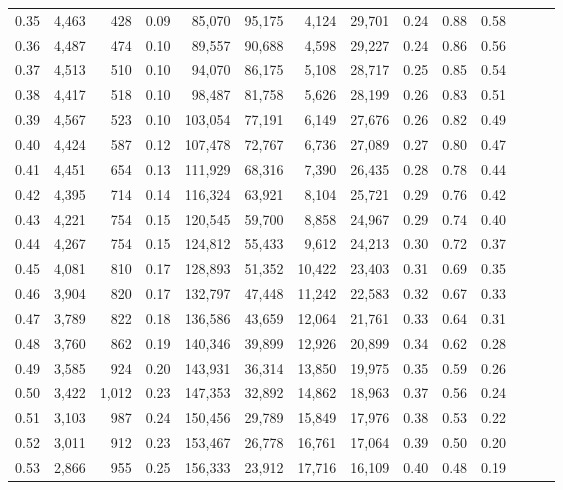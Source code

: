 \begin{tabular}{rrrrrrrrrrrrrr}
0.35 &  4,463 &    428 &  0.09 &   85,070 &   95,175 &   4,124 &  29,701 &  0.24 &  0.88 &      0.58 \\
0.36 &  4,487 &    474 &  0.10 &   89,557 &   90,688 &   4,598 &  29,227 &  0.24 &  0.86 &      0.56 \\
0.37 &  4,513 &    510 &  0.10 &   94,070 &   86,175 &   5,108 &  28,717 &  0.25 &  0.85 &      0.54 \\
0.38 &  4,417 &    518 &  0.10 &   98,487 &   81,758 &   5,626 &  28,199 &  0.26 &  0.83 &      0.51 \\
0.39 &  4,567 &    523 &  0.10 &  103,054 &   77,191 &   6,149 &  27,676 &  0.26 &  0.82 &      0.49 \\
0.40 &  4,424 &    587 &  0.12 &  107,478 &   72,767 &   6,736 &  27,089 &  0.27 &  0.80 &      0.47 \\
0.41 &  4,451 &    654 &  0.13 &  111,929 &   68,316 &   7,390 &  26,435 &  0.28 &  0.78 &      0.44 \\
0.42 &  4,395 &    714 &  0.14 &  116,324 &   63,921 &   8,104 &  25,721 &  0.29 &  0.76 &      0.42 \\
0.43 &  4,221 &    754 &  0.15 &  120,545 &   59,700 &   8,858 &  24,967 &  0.29 &  0.74 &      0.40 \\
0.44 &  4,267 &    754 &  0.15 &  124,812 &   55,433 &   9,612 &  24,213 &  0.30 &  0.72 &      0.37 \\
0.45 &  4,081 &    810 &  0.17 &  128,893 &   51,352 &  10,422 &  23,403 &  0.31 &  0.69 &      0.35 \\
0.46 &  3,904 &    820 &  0.17 &  132,797 &   47,448 &  11,242 &  22,583 &  0.32 &  0.67 &      0.33 \\
0.47 &  3,789 &    822 &  0.18 &  136,586 &   43,659 &  12,064 &  21,761 &  0.33 &  0.64 &      0.31 \\
0.48 &  3,760 &    862 &  0.19 &  140,346 &   39,899 &  12,926 &  20,899 &  0.34 &  0.62 &      0.28 \\
0.49 &  3,585 &    924 &  0.20 &  143,931 &   36,314 &  13,850 &  19,975 &  0.35 &  0.59 &      0.26 \\
0.50 &  3,422 &  1,012 &  0.23 &  147,353 &   32,892 &  14,862 &  18,963 &  0.37 &  0.56 &      0.24 \\
0.51 &  3,103 &    987 &  0.24 &  150,456 &   29,789 &  15,849 &  17,976 &  0.38 &  0.53 &      0.22 \\
0.52 &  3,011 &    912 &  0.23 &  153,467 &   26,778 &  16,761 &  17,064 &  0.39 &  0.50 &      0.20 \\
0.53 &  2,866 &    955 &  0.25 &  156,333 &   23,912 &  17,716 &  16,109 &  0.40 &  0.48 &      0.19 \\

\end{tabular}
